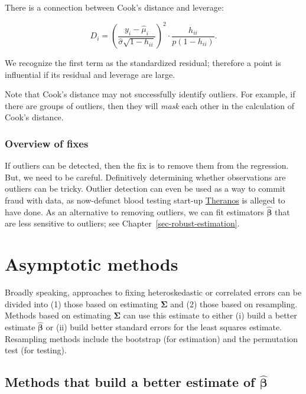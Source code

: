 \documentclass[
  11pt,
  letterpaper,
  oneside]{book}
\theoremstyle{definition}
\theoremstyle{plain}
\theoremstyle{plain}
\theoremstyle{plain}
\theoremstyle{remark}
\begin{document}
There is a connection between Cook's distance and leverage:

\[
D_i = \left(\frac{y_i - \widehat{\mu}_i}{\widehat{\sigma} \sqrt{1-h_{ii}}}\right)^2 \cdot \frac{h_{ii}}{p(1-h_{ii})}.
\]

We recognize the first term as the standardized residual; therefore a
point is influential if its residual and leverage are large.

Note that Cook's distance may not successfully identify outliers. For
example, if there are groups of outliers, then they will \emph{mask}
each other in the calculation of Cook's distance.

\hypertarget{overview-of-fixes-1}{%
\subsection{Overview of fixes}\label{overview-of-fixes-1}}

If outliers can be detected, then the fix is to remove them from the
regression. But, we need to be careful. Definitively determining whether
observations are outliers can be tricky. Outlier detection can even be
used as a way to commit fraud with data, as now-defunct blood testing
start-up
\href{https://arstechnica.com/tech-policy/2021/09/cherry-picking-data-was-routine-practice-at-theranos-former-lab-worker-says/}{Theranos}
is alleged to have done. As an alternative to removing outliers, we can
fit estimators \(\boldsymbol{\widehat{\beta}}\) that are less sensitive
to outliers; see Chapter~\ref{sec-robust-estimation}.

\hypertarget{sec-asymptotic-methods}{%
\chapter{Asymptotic methods}\label{sec-asymptotic-methods}}

Broadly speaking, approaches to fixing heteroskedastic or correlated
errors can be divided into (1) those based on estimating
\(\boldsymbol{\Sigma}\) and (2) those based on resampling. Methods based
on estimating \(\boldsymbol{\Sigma}\) can use this estimate to either
(i) build a better estimate \(\boldsymbol{\widehat{\beta}}\) or (ii)
build better standard errors for the least squares estimate. Resampling
methods include the bootstrap (for estimation) and the permutation test
(for testing).

\hypertarget{sec-better-estimate}{%
\section{\texorpdfstring{Methods that build a better estimate of
\(\boldsymbol{\widehat{\beta}}\)}{Methods that build a better estimate of \textbackslash boldsymbol\{\textbackslash widehat\{\textbackslash beta\}\}}}\label{sec-better-estimate}}
\end{document}
